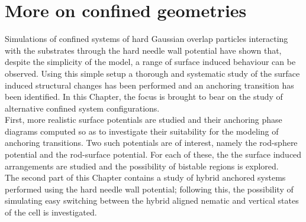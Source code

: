 

\chapter{More on confined geometries}
\label{chap:five}

\introduction

Simulations of confined systems of hard Gaussian overlap particles interacting with the
substrates through the hard needle wall potential have shown that, despite the simplicity 
of the model, a range of surface induced behaviour can be observed. Using this simple setup 
a thorough and systematic study of the surface induced structural changes has been performed 
and an anchoring transition has been identified. In this Chapter, the focus is 
brought to bear on the study of alternative confined system configurations.\\
%
First, more realistic surface potentials are studied and their anchoring phase diagrams computed 
so as to investigate their suitability for the modeling of anchoring transitions. Two such 
potentials are of interest, namely the rod-sphere potential and the rod-surface potential. For
each of these, the the surface induced arrangements are studied and the possibility of 
bistable regions is explored.\\
%
The second part of this Chapter contains a study of hybrid anchored systems performed
using the hard needle wall potential; following this, the possibility of simulating 
easy switching between the hybrid aligned nematic and vertical states of the cell is investigated.







\conclusion

